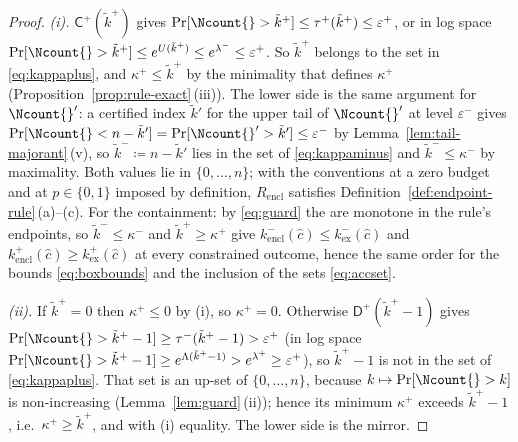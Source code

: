 \begin{proof}
\emph{(i).} $\mathsf{C}^{+}(\tilde k^{+})$ gives
$\Pr[\Ncount{}>\tilde k^{+}]\le\tau^{+}(\tilde k^{+})\le\varepsilon^{+}$, or
in log space $\Pr[\Ncount{}>\tilde k^{+}]\le e^{U(\tilde k^{+})}
\le e^{\lambda^{-}}\le\varepsilon^{+}$. So $\tilde k^{+}$ belongs to the set
in \eqref{eq:kappaplus}, and $\kappa^{+}\le\tilde k^{+}$ by the minimality
that defines $\kappa^{+}$ (Proposition~\ref{prop:rule-exact}\,(iii)). The
lower side is the same argument for $\Ncount{}'$: a certified index
$\tilde k'$ for the upper tail of $\Ncount{}'$ at level $\varepsilon^{-}$
gives $\Pr[\Ncount{}<n-\tilde k']=\Pr[\Ncount{}'>\tilde k']\le\varepsilon^{-}$
by Lemma~\ref{lem:tail-majorant}\,(v), so $\tilde k^{-}\coloneqq n-\tilde k'$
lies in the set of \eqref{eq:kappaminus} and $\tilde k^{-}\le\kappa^{-}$ by
maximality. Both values lie in $\{0,\dots,n\}$; with the conventions at a
zero budget and at $p\in\{0,1\}$ imposed by definition, $R_{\mathrm{encl}}$
satisfies Definition~\ref{def:endpoint-rule}\,(a)--(c). For the containment:
by \eqref{eq:guard} the  are monotone in the rule's
endpoints, so $\tilde k^{-}\le\kappa^{-}$ and $\tilde k^{+}\ge\kappa^{+}$
give $k^{-}_{\mathrm{encl}}(\hat c)\le k^{-}_{\mathrm{ex}}(\hat c)$ and
$k^{+}_{\mathrm{encl}}(\hat c)\ge k^{+}_{\mathrm{ex}}(\hat c)$ at every
constrained outcome, hence the same order for the bounds \eqref{eq:boxbounds}
and the inclusion of the sets \eqref{eq:accset}.

\emph{(ii).} If $\tilde k^{+}=0$ then $\kappa^{+}\le0$ by (i), so
$\kappa^{+}=0$. Otherwise $\mathsf{D}^{+}(\tilde k^{+}-1)$ gives
$\Pr[\Ncount{}>\tilde k^{+}-1]\ge\tau^{-}(\tilde k^{+}-1)>\varepsilon^{+}$
(in log space
$\Pr[\Ncount{}>\tilde k^{+}-1]\ge e^{\Lambda(\tilde k^{+}-1)}
>e^{\lambda^{+}}\ge\varepsilon^{+}$), so $\tilde k^{+}-1$ is not in the set
of \eqref{eq:kappaplus}. That set is an up-set of $\{0,\dots,n\}$, because
$k\mapsto\Pr[\Ncount{}>k]$ is non-increasing (Lemma~\ref{lem:guard}\,(ii));
hence its minimum $\kappa^{+}$ exceeds $\tilde k^{+}-1$, i.e.\
$\kappa^{+}\ge\tilde k^{+}$, and with (i) equality. The lower side is the
mirror.


\end{proof}

